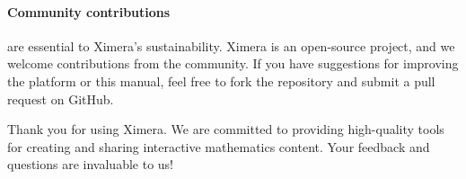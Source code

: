 \documentclass{ximera}
\begin{document}
\paragraph{Community contributions} are essential to Ximera's sustainability. 
Ximera is an open-source project, and we welcome contributions from the
community. If you have suggestions for improving the platform or this manual,
feel free to fork the repository and submit a pull request on GitHub.





Thank you for using Ximera. We are committed to providing high-quality tools
for creating and sharing interactive mathematics content. Your feedback and
questions are invaluable to us!
\end{document}
